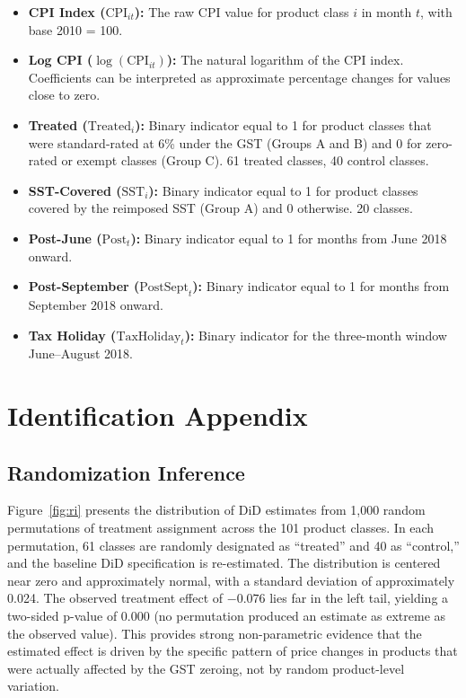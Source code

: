 \documentclass[12pt]{article}
\begin{document}
\begin{itemize}
\item \textbf{CPI Index ($\text{CPI}_{it}$):} The raw CPI value for product class $i$ in month $t$, with base 2010 = 100.
\item \textbf{Log CPI ($\log(\text{CPI}_{it})$):} The natural logarithm of the CPI index. Coefficients can be interpreted as approximate percentage changes for values close to zero.
\item \textbf{Treated ($\text{Treated}_i$):} Binary indicator equal to 1 for product classes that were standard-rated at 6\% under the GST (Groups A and B) and 0 for zero-rated or exempt classes (Group C). 61 treated classes, 40 control classes.
\item \textbf{SST-Covered ($\text{SST}_i$):} Binary indicator equal to 1 for product classes covered by the reimposed SST (Group A) and 0 otherwise. 20 classes.
\item \textbf{Post-June ($\text{Post}_t$):} Binary indicator equal to 1 for months from June 2018 onward.
\item \textbf{Post-September ($\text{PostSept}_t$):} Binary indicator equal to 1 for months from September 2018 onward.
\item \textbf{Tax Holiday ($\text{TaxHoliday}_t$):} Binary indicator for the three-month window June--August 2018.
\end{itemize}


\section{Identification Appendix}
\label{app:identification}

\subsection{Randomization Inference}

Figure~\ref{fig:ri} presents the distribution of DiD estimates from 1,000 random permutations of treatment assignment across the 101 product classes. In each permutation, 61 classes are randomly designated as ``treated'' and 40 as ``control,'' and the baseline DiD specification is re-estimated. The distribution is centered near zero and approximately normal, with a standard deviation of approximately 0.024. The observed treatment effect of $-0.076$ lies far in the left tail, yielding a two-sided p-value of 0.000 (no permutation produced an estimate as extreme as the observed value). This provides strong non-parametric evidence that the estimated effect is driven by the specific pattern of price changes in products that were actually affected by the GST zeroing, not by random product-level variation.
\end{document}
